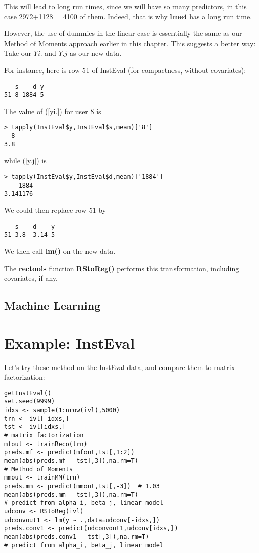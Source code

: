 This will lead to long run times, since we will have so many predictors,
in this case 2972+1128 = 4100 of them.  Indeed, that is why \textbf{lme4}
has a long run time.

However, the use of dummies in the linear case is essentially the same
as our Method of Moments approach earlier in this chapter.  This
suggests a better way:  Take our $Yi.$ and $Y.j$
as our new data.

For instance, here is row 51 of InstEval (for compactness,
without covariates):

\begin{lstlisting}
   s    d y 
51 8 1884 5       
\end{lstlisting}

The value of (\ref{yi.}) for user 8 is

\begin{lstlisting}
> tapply(InstEval$y,InstEval$s,mean)['8']
  8 
3.8 
\end{lstlisting}

while (\ref{y.j}) is

\begin{lstlisting}
> tapply(InstEval$y,InstEval$d,mean)['1884']
    1884 
3.141176 
\end{lstlisting}

We could then replace row 51 by

\begin{lstlisting}
   s    d    y 
51 3.8  3.14 5       
\end{lstlisting}

We then call \textbf{lm()} on the new data.

The \textbf{rectools} function \textbf{RStoReg()} performs this
transformation, including covariates, if any.

\subsection{Machine Learning}

\section{Example: InstEval}

Let's try these method on the InstEval data, and compare them to matrix
factorization:

\begin{lstlisting}
getInstEval()
set.seed(9999)
idxs <- sample(1:nrow(ivl),5000)
trn <- ivl[-idxs,]
tst <- ivl[idxs,]
# matrix factorization
mfout <- trainReco(trn)
preds.mf <- predict(mfout,tst[,1:2])
mean(abs(preds.mf - tst[,3]),na.rm=T)  
# Method of Moments
mmout <- trainMM(trn)
preds.mm <- predict(mmout,tst[,-3])  # 1.03
mean(abs(preds.mm - tst[,3]),na.rm=T)
# predict from alpha_i, beta_j, linear model
udconv <- RStoReg(ivl)
udconvout1 <- lm(y ~ .,data=udconv[-idxs,])
preds.conv1 <- predict(udconvout1,udconv[idxs,])
mean(abs(preds.conv1 - tst[,3]),na.rm=T)  
# predict from alpha_i, beta_j, linear model
\end{lstlisting}

